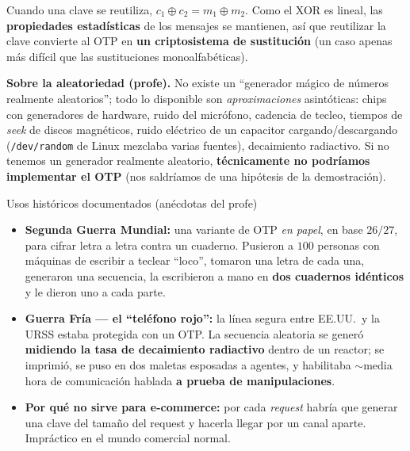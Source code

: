 \documentclass[11pt,a4paper]{article}
\newcommand{\xor}{\oplus}
\begin{document}
Cuando una clave se reutiliza, $c_1\xor c_2 = m_1\xor m_2$. Como el XOR es lineal, las
\textbf{propiedades estadísticas} de los mensajes se mantienen, así que reutilizar la
clave convierte al OTP en \textbf{un criptosistema de sustitución} (un caso apenas más
difícil que las sustituciones monoalfabéticas).

\begin{slidebox}
\textbf{Sobre la aleatoriedad (profe).} No existe un ``generador mágico de números
realmente aleatorios''; todo lo disponible son \emph{aproximaciones} asintóticas: chips
con generadores de hardware, ruido del micrófono, cadencia de tecleo, tiempos de
\emph{seek} de discos magnéticos, ruido eléctrico de un capacitor cargando/descargando
(\texttt{/dev/random} de Linux mezclaba varias fuentes), decaimiento radiactivo. Si no
tenemos un generador realmente aleatorio, \textbf{técnicamente no podríamos implementar
el OTP} (nos saldríamos de una hipótesis de la demostración).
\end{slidebox}

\begin{practbox}{Usos históricos documentados (anécdotas del profe)}
\begin{itemize}[leftmargin=1.3em,itemsep=2pt]
  \item \textbf{Segunda Guerra Mundial:} una variante de OTP \emph{en papel}, en base
        $26/27$, para cifrar letra a letra contra un cuaderno. Pusieron a $100$ personas
        con máquinas de escribir a teclear ``loco'', tomaron una letra de cada una,
        generaron una secuencia, la escribieron a mano en \textbf{dos cuadernos
        idénticos} y le dieron uno a cada parte.
  \item \textbf{Guerra Fría — el ``teléfono rojo'':} la línea segura entre EE.UU.\ y la
        URSS estaba protegida con un OTP. La secuencia aleatoria se generó
        \textbf{midiendo la tasa de decaimiento radiactivo} dentro de un reactor; se
        imprimió, se puso en dos maletas esposadas a agentes, y habilitaba $\sim$media
        hora de comunicación hablada \textbf{a prueba de manipulaciones}.
  \item \textbf{Por qué no sirve para e-commerce:} por cada \emph{request} habría que
        generar una clave del tamaño del request y hacerla llegar por un canal aparte.
        Impráctico en el mundo comercial normal.
\end{itemize}
\end{practbox}

\end{document}
